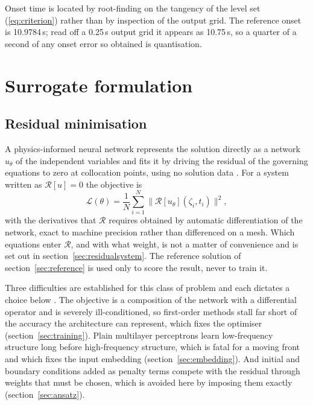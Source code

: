 \documentclass[11pt,a4paper]{article}
\begin{document}
Onset time is located by root-finding on the tangency of the level set
(\ref{eq:criterion}) rather than by inspection of the output grid. The reference onset is
10.9784\,s; read off a 0.25\,s output grid it appears as 10.75\,s, so a quarter of a second
of any onset error so obtained is quantisation.

\section{Surrogate formulation}\label{sec:method}

\subsection{Residual minimisation}

A physics-informed neural network represents the solution directly as a network $u_\theta$
of the independent variables and fits it by driving the residual of the governing equations
to zero at collocation points, using no solution data \cite{raissi,karniadakis}. For a
system written as $\mathcal{R}[u] = 0$ the objective is
\begin{equation}\label{eq:pinnloss}
\mathcal{L}(\theta) = \frac{1}{N}\sum_{i=1}^{N}
\bigl\lVert \mathcal{R}[u_\theta](\zeta_i, t_i)\bigr\rVert^2 ,
\end{equation}
with the derivatives that $\mathcal{R}$ requires obtained by automatic differentiation of
the network, exact to machine precision rather than differenced on a mesh. Which equations
enter $\mathcal{R}$, and with what weight, is not a matter of convenience and is set out in
section~\ref{sec:residualsystem}. The reference solution of section~\ref{sec:reference} is
used only to score the result, never to train it.

Three difficulties are established for this class of problem and each dictates a choice
below \cite{krishnapriyan}. The objective is a composition of the network with a
differential operator and is severely ill-conditioned, so first-order methods stall far
short of the accuracy the architecture can represent, which fixes the optimiser
(section~\ref{sec:training}). Plain multilayer perceptrons learn low-frequency structure
long before high-frequency structure, which is fatal for a moving front and which fixes the
input embedding (section~\ref{sec:embedding}). And initial and boundary conditions added as
penalty terms compete with the residual through weights that must be chosen, which is
avoided here by imposing them exactly (section~\ref{sec:ansatz}).
\end{document}
